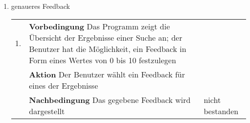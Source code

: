 \begin{enumerate} [label=\bfseries /TSW \arabic*0/, leftmargin=*]
	\item genaueres Feedback \newline \newline
	\begin{tabular}{rp{4in}|l}
	1. & \textbf{Vorbedingung} Das Programm zeigt die Übersicht der Ergebnisse einer Suche an; der Benutzer hat die Möglichkeit, ein Feedback in Form eines Wertes von 0 bis 10 festzulegen & \\
	   & \textbf{Aktion} Der Benutzer wählt ein Feedback für eines der Ergebnisse & \\
	   & \textbf{Nachbedingung} Das gegebene Feedback wird dargestellt & nicht bestanden \\
	\end{tabular}
\end{enumerate}
